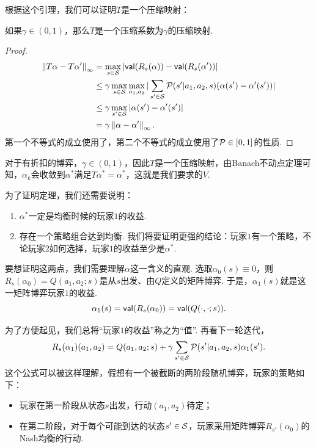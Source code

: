 根据这个引理，我们可以证明$T$是一个压缩映射：

\begin{lemma}
    如果$\gamma\in(0,1)$，那么$T$是一个压缩系数为$\gamma$的压缩映射.
\end{lemma}
\begin{proof}
\begin{align*}
    \left\|T\alpha-T\alpha'\right\|_\infty &= \max_{s\in \mathcal S}|\mathsf{val} (R_s(\alpha)) - \mathsf{val}(R_s(\alpha'))| \\
    &\leq \gamma \max_{s\in \mathcal S} \max_{a_1,a_2}|\sum_{s'\in \mathcal S}\mathcal P(s'|a_1,a_2,s)(\alpha(s') - \alpha'(s'))| \\
    &\leq \gamma \max_{s'\in \mathcal S} |\alpha(s') - \alpha'(s')| \\
    &= \gamma \left\|\alpha-\alpha'\right\|_\infty.
\end{align*}
第一个不等式的成立使用了，第二个不等式的成立使用了$\mathcal P\in[0,1]$的性质. 
\end{proof}

对于有折扣的博弈，$\gamma\in (0,1)$，因此$T$是一个压缩映射，由Banach不动点定理可知，$\alpha_k$会收敛到$\alpha^*$满足$T\alpha^*=\alpha^*$，这就是我们要求的$V$.

为了证明定理，我们还需要说明：
\begin{enumerate}
    \item $\alpha^*$一定是均衡时候的玩家$1$的收益.
    \item 存在一个策略组合达到均衡. 我们将要证明更强的结论：玩家$1$有一个策略，不论玩家$2$如何选择，玩家$1$的收益至少是$\alpha^*$.
\end{enumerate}

要想证明这两点，我们需要理解$\alpha$这一含义的直观. 选取$\alpha_0(s)\equiv 0$，则$R_s(\alpha_0)=Q(a_1,a_2;s)$是从$s$出发、由$Q$定义的矩阵博弈. 于是，$\alpha_1(s)$就是这一矩阵博弈玩家$1$的收益. 
    \[\alpha_1(s)=\mathsf{val}(R_s(\alpha_0))=\mathsf{val}(Q(\cdot,\cdot;s)).\]

为了方便起见，我们总将“玩家$1$的收益”称之为“值”. 再看下一轮迭代，
\[R_s(\alpha_1)(a_1,a_2)=Q(a_1,a_2;s)+\gamma\sum_{s'\in \mathcal S}\mathcal P(s'|a_1,a_2,s)\alpha_1(s').\]
这个公式可以被这样理解，假想有一个被截断的两阶段随机博弈，玩家的策略如下：
    \begin{itemize}
        \item 玩家在第一阶段从状态$s$出发，行动$(a_1,a_2)$待定；
        \item 在第二阶段，对于每个可能到达的状态$s'\in \mathcal S$，玩家采用矩阵博弈$R_{s'}(\alpha_0)$的Nash均衡的行动.
    \end{itemize}


